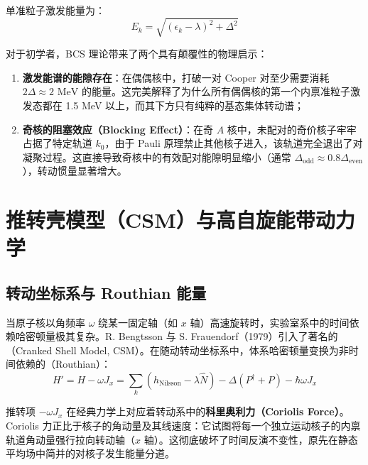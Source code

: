 单准粒子激发能量为：
\begin{equation}
    E_k = \sqrt{(\epsilon_k - \lambda)^2 + \Delta^2}
\end{equation}

对于初学者，BCS 理论带来了两个具有颠覆性的物理启示：
\begin{enumerate}
    \item \textbf{激发能谱的能隙存在}：在偶偶核中，打破一对 Cooper 对至少需要消耗 $2\Delta \approx 2 \text{ MeV}$ 的能量。这完美解释了为什么所有偶偶核的第一个内禀准粒子激发态都在 1.5 MeV 以上，而其下方只有纯粹的基态集体转动谱；
    \item \textbf{奇核的阻塞效应（Blocking Effect）}：在奇 $A$ 核中，未配对的奇价核子牢牢占据了特定轨道 $k_0$，由于 Pauli 原理禁止其他核子进入，该轨道完全退出了对凝聚过程。这直接导致奇核中的有效配对能隙明显缩小（通常 $\Delta_{\text{odd}} \approx 0.8 \Delta_{\text{even}}$），转动惯量显著增大。
\end{enumerate}

\section{推转壳模型（CSM）与高自旋能带动力学}
\label{sec:cranked_shell_model}

\subsection{转动坐标系与 Routhian 能量}

当原子核以角频率 $\omega$ 绕某一固定轴（如 $x$ 轴）高速旋转时，实验室系中的时间依赖哈密顿量极其复杂。R. Bengtsson 与 S. Frauendorf（1979）引入了著名的（Cranked Shell Model, CSM）。在随动转动坐标系中，体系哈密顿量变换为非时间依赖的（Routhian）：
\begin{equation}
    H' = H - \omega J_x = \sum_k (h_{\text{Nilsson}} - \lambda \hat{N}) - \Delta (P^\dagger + P) - \hbar\omega J_x
    \label{eq:csm_routhian}
\end{equation}

推转项 $-\omega J_x$ 在经典力学上对应着转动系中的\textbf{科里奥利力（Coriolis Force）}。Coriolis 力正比于核子的角动量及其线速度：它试图将每一个独立运动核子的内禀轨道角动量强行拉向转动轴（$x$ 轴）。这彻底破坏了时间反演不变性，原先在静态平均场中简并的对核子发生能量分道。


